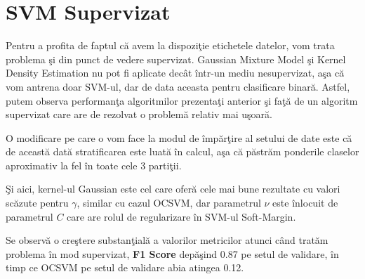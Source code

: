 \noindent

\section{SVM Supervizat}

Pentru a profita de faptul că avem la dispoziţie etichetele datelor, vom trata 
problema şi din punct de vedere supervizat. Gaussian Mixture Model şi Kernel 
Density Estimation nu pot fi aplicate decât într-un mediu nesupervizat, aşa 
că vom antrena doar SVM-ul, dar de data aceasta pentru clasificare binară.
Astfel, putem observa performanţa algoritmilor prezentaţi anterior şi faţă 
de un algoritm supervizat care are de rezolvat o problemă relativ mai uşoară.

O modificare pe care o vom face la modul de împărţire al setului de date 
este că de această dată stratificarea este luată în calcul, aşa că păstrăm 
ponderile claselor aproximativ la fel în toate cele 3 partiţii.

Şi aici, kernel-ul Gaussian este cel care oferă cele mai bune rezultate cu 
valori scăzute pentru $\gamma$, similar cu cazul OCSVM, dar parametrul 
$\nu$ este înlocuit
de parametrul $C$ care are rolul de regularizare în SVM-ul Soft-Margin.

Se observă o creştere substanţială a valorilor metricilor atunci când tratăm 
problema în mod supervizat, \textbf{F1 Score} 
depăşind 0.87 pe setul de validare, în timp ce 
OCSVM pe setul de validare abia atingea 0.12.

